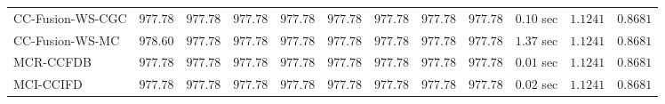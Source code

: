 \begin{table}[H]
\begin{tabular}{lrrrrrrrrrrr}
    CC-Fusion-WS-CGC & $       977.78$ & $       977.78$ & $       977.78$ & $       977.78$ & $       977.78$ & $       977.78$ & $       977.78$ & $       977.78$ & $         0.10$ sec    & $       1.1241$  & $       0.8681$ \\ 
     CC-Fusion-WS-MC & $       978.60$ & $       977.78$ & $       977.78$ & $       977.78$ & $       977.78$ & $       977.78$ & $       977.78$ & $       977.78$ & $         1.37$ sec    & $       1.1241$  & $       0.8681$ \\ 
\cmidrule{1-1} 
           MCR-CCFDB & $       977.78$ & $       977.78$ & $       977.78$ & $       977.78$ & $       977.78$ & $       977.78$ & $       977.78$ & $       977.78$ & $         0.01$ sec    & $       1.1241$  & $       0.8681$ \\ 
\cmidrule{1-1} 
           MCI-CCIFD & $       977.78$ & $       977.78$ & $       977.78$ & $       977.78$ & $       977.78$ & $       977.78$ & $       977.78$ & $       977.78$ & $         0.02$ sec    & $       1.1241$  & $       0.8681$ \\ 
\bottomrule
\end{tabular}
\end{table}

